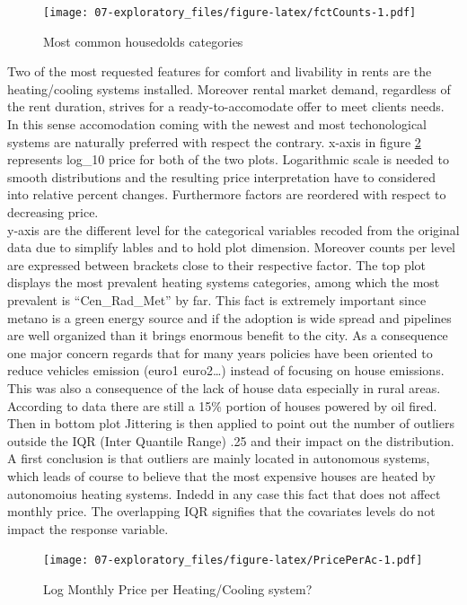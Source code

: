 \documentclass[
  12pt,
  a4paper,
  oneside]{book}
\theoremstyle{definition}
\theoremstyle{definition}
\theoremstyle{definition}
\theoremstyle{remark}
\begin{document}
\begin{figure}
\centering
\texttt{[image: 07-exploratory\_files/figure-latex/fctCounts-1.pdf]}
\caption{\label{fig:fctCounts}Most common housedolds categories}
\end{figure}

Two of the most requested features for comfort and livability in rents are the heating/cooling systems installed. Moreover rental market demand, regardless of the rent duration, strives for a ready-to-accomodate offer to meet clients needs. In this sense accomodation coming with the newest and most techonological systems are naturally preferred with respect the contrary.
x-axis in figure \ref{fig:PricePerAc} represents log\_10 price for both of the two plots. Logarithmic scale is needed to smooth distributions and the resulting price interpretation have to considered into relative percent changes. Furthermore factors are reordered with respect to decreasing price.\\
y-axis are the different level for the categorical variables recoded from the original data due to simplify lables and to hold plot dimension. Moreover counts per level are expressed between brackets close to their respective factor.
The top plot displays the most prevalent heating systems categories, among which the most prevalent is ``Cen\_Rad\_Met'' by far. This fact is extremely important since metano is a green energy source and if the adoption is wide spread and pipelines are well organized than it brings enormous benefit to the city. As a consequence one major concern regards that for many years policies have been oriented to reduce vehicles emission (euro1 euro2\ldots) instead of focusing on house emissions. This was also a consequence of the lack of house data especially in rural areas. According to data there are still a 15\% portion of houses powered by oil fired.
Then in bottom plot Jittering is then applied to point out the number of outliers outside the IQR (Inter Quantile Range) .25 and their impact on the distribution. A first conclusion is that outliers are mainly located in autonomous systems, which leads of course to believe that the most expensive houses are heated by autonomoius heating systems. Indedd in any case this fact that does not affect monthly price. The overlapping IQR signifies that the covariates levels do not impact the response variable.

\begin{figure}
\centering
\texttt{[image: 07-exploratory\_files/figure-latex/PricePerAc-1.pdf]}
\caption{\label{fig:PricePerAc}Log Monthly Price per Heating/Cooling system?}
\end{figure}
\end{document}
